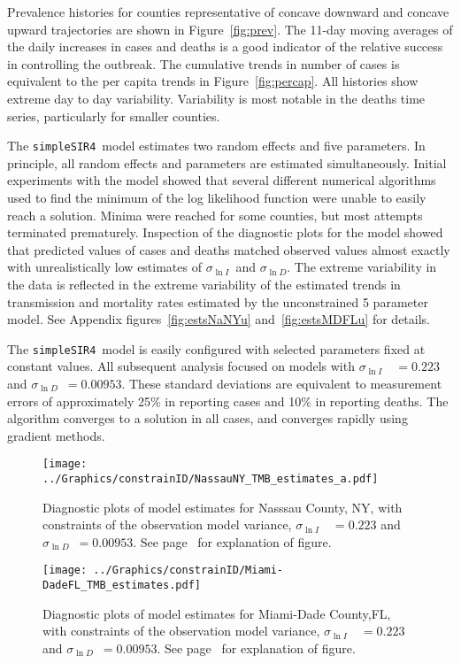 \documentclass[12pt,letterpaper]{article}
\newcommand\SSm{{\tt simpleSIR4}}
\newcommand\slI{$\sigma_{\ln I}$\ }
\newcommand\slD{$\sigma_{\ln D}$}
\begin{document}
Prevalence histories for counties representative of concave
downward and concave upward trajectories are shown in
Figure~\ref{fig:prev}. The 11-day moving averages of the daily
increases in cases and deaths is a good indicator of the
relative success in controlling the outbreak.
The cumulative trends in number of cases is equivalent to 
the per capita trends in Figure~\ref{fig:percap}.
All histories show extreme day to day variability.
Variability is most notable in the deaths
time series, particularly for smaller counties.

The \SSm\  model estimates two random effects and five parameters.
In principle, all random effects and parameters are estimated
simultaneously.
Initial experiments with the model showed that several different
numerical algorithms used to find the minimum of the log likelihood
function were unable to easily reach a solution. Minima were reached
for some counties, but most attempts terminated prematurely. 
Inspection of the diagnostic plots for the model showed that predicted
values of cases and deaths matched observed values almost exactly
with unrealistically low estimates of \slI and \slD.
The extreme variability in the data is reflected in the extreme
variability of the estimated trends in transmission and mortality
rates estimated by the unconstrained 5 parameter model.
See Appendix figures~\ref{fig:estsNaNYu} and~\ref{fig:estsMDFLu}
for details.

The \SSm\ model is easily configured with selected parameters fixed at
constant values. 
All subsequent analysis focused on models with 
\slI~$ = 0.223$ and \slD~$= 0.00953$. 
These standard deviations are equivalent to measurement errors of
approximately 25\% in reporting cases and 10\% in reporting deaths.
The algorithm converges to a solution in all cases, and converges
rapidly using gradient methods.

\begin{figure}
\begin{center}
\texttt{[image: ../Graphics/constrainID/NassauNY\_TMB\_estimates\_a.pdf]}
\end{center}
\caption{\label{fig:estsNaNYc}
Diagnostic plots of model estimates for Nasssau County, NY, 
with constraints of the observation model variance, 
\slI~$ = 0.223$ and \slD~$= 0.00953$. 
See page~\pageref{pp:diagexpl} for explanation of figure.
}
\end{figure}

\begin{figure}
\begin{center}
\texttt{[image: ../Graphics/constrainID/Miami-DadeFL\_TMB\_estimates.pdf]}
\end{center}
\caption{\label{fig:estsMDFLc}
Diagnostic plots of model estimates for Miami-Dade County,FL,
with constraints of the observation model variance, 
\slI~$ = 0.223$ and \slD~$= 0.00953$. 
See page~\pageref{pp:diagexpl} for explanation of figure.
}
\end{figure}
\end{document}
